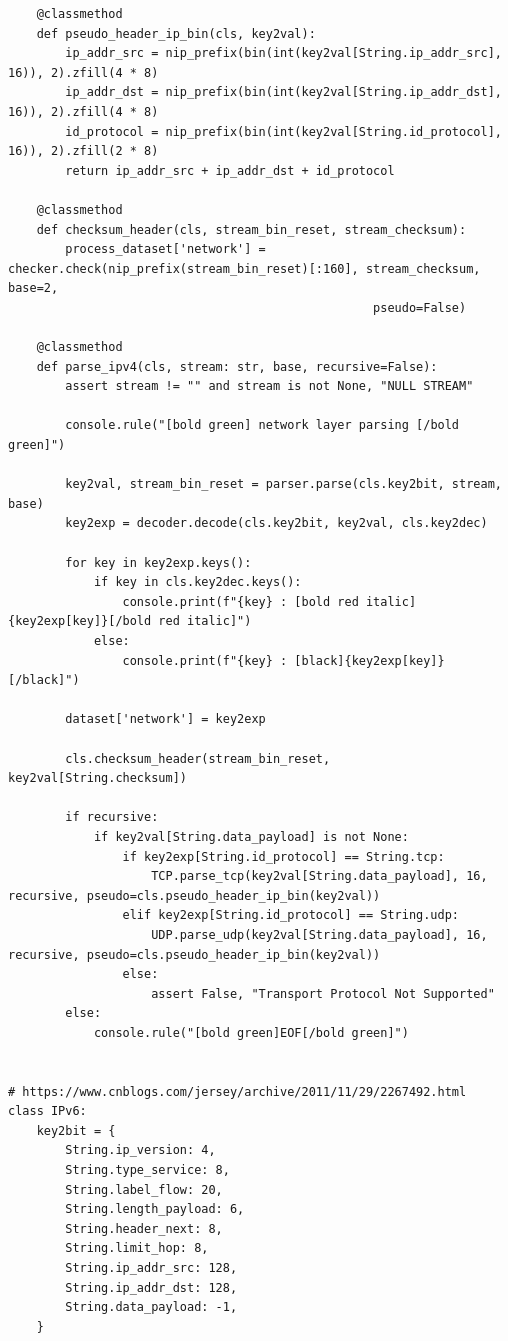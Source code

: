 \documentclass[a4paper,11pt]{article}
\begin{document}
\begin{spacing}{1.2}
\begin{CJK}{UTF8}{gbsn}
\begin{lstlisting}
    @classmethod
    def pseudo_header_ip_bin(cls, key2val):
        ip_addr_src = nip_prefix(bin(int(key2val[String.ip_addr_src], 16)), 2).zfill(4 * 8)
        ip_addr_dst = nip_prefix(bin(int(key2val[String.ip_addr_dst], 16)), 2).zfill(4 * 8)
        id_protocol = nip_prefix(bin(int(key2val[String.id_protocol], 16)), 2).zfill(2 * 8)
        return ip_addr_src + ip_addr_dst + id_protocol

    @classmethod
    def checksum_header(cls, stream_bin_reset, stream_checksum):
        process_dataset['network'] = checker.check(nip_prefix(stream_bin_reset)[:160], stream_checksum, base=2,
                                                   pseudo=False)

    @classmethod
    def parse_ipv4(cls, stream: str, base, recursive=False):
        assert stream != "" and stream is not None, "NULL STREAM"

        console.rule("[bold green] network layer parsing [/bold green]")

        key2val, stream_bin_reset = parser.parse(cls.key2bit, stream, base)
        key2exp = decoder.decode(cls.key2bit, key2val, cls.key2dec)

        for key in key2exp.keys():
            if key in cls.key2dec.keys():
                console.print(f"{key} : [bold red italic]{key2exp[key]}[/bold red italic]")
            else:
                console.print(f"{key} : [black]{key2exp[key]}[/black]")

        dataset['network'] = key2exp

        cls.checksum_header(stream_bin_reset, key2val[String.checksum])

        if recursive:
            if key2val[String.data_payload] is not None:
                if key2exp[String.id_protocol] == String.tcp:
                    TCP.parse_tcp(key2val[String.data_payload], 16, recursive, pseudo=cls.pseudo_header_ip_bin(key2val))
                elif key2exp[String.id_protocol] == String.udp:
                    UDP.parse_udp(key2val[String.data_payload], 16, recursive, pseudo=cls.pseudo_header_ip_bin(key2val))
                else:
                    assert False, "Transport Protocol Not Supported"
        else:
            console.rule("[bold green]EOF[/bold green]")


# https://www.cnblogs.com/jersey/archive/2011/11/29/2267492.html
class IPv6:
    key2bit = {
        String.ip_version: 4,
        String.type_service: 8,
        String.label_flow: 20,
        String.length_payload: 6,
        String.header_next: 8,
        String.limit_hop: 8,
        String.ip_addr_src: 128,
        String.ip_addr_dst: 128,
        String.data_payload: -1,
    }


\end{lstlisting}
\end{CJK}
\end{spacing}
\end{document}
